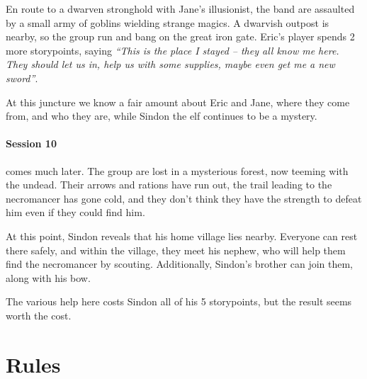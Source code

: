 \begin{multicols}{2}
{En route to a dwarven stronghold with Jane's illusionist, the band are assaulted by a small army of goblins wielding strange magics.
A dwarvish outpost is nearby, so the group run and bang on the great iron gate.  Eric's player spends 2 more \glspl{storypoint}, saying \textit{``This is the place I stayed -- they all know me here.
They should let us in, help us with some supplies, maybe even get me a new sword''}.

At this juncture we know a fair amount about Eric and Jane, where they come from, and who they are, while Sindon the elf continues to be a mystery.

\paragraph{Session 10} comes much later.
The group are lost in a mysterious forest, now teeming with the undead.
Their arrows and rations have run out, the trail leading to the necromancer has gone cold, and they don't think they have the strength to defeat him even if they could find him.

At this point, Sindon reveals that his home village lies nearby.
Everyone can rest there safely, and within the village, they meet his nephew, who will help them find the necromancer by scouting.
Additionally, Sindon's brother can join them, along with his bow.

The various help here costs Sindon all of his 5 \glspl{storypoint}, but the result seems worth the cost.

}{}
\end{multicols}

\section{ Rules}

